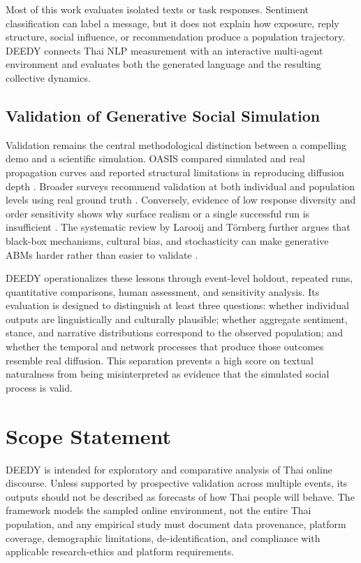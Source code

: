\documentclass[10pt,twocolumn]{article}
\begin{document}
Most of this work evaluates isolated texts or task responses. Sentiment
classification can label a message, but it does not explain how exposure,
reply structure, social influence, or recommendation produce a population
trajectory. DEEDY connects Thai NLP measurement with an interactive
multi-agent environment and evaluates both the generated language and the
resulting collective dynamics.

\subsection{Validation of Generative Social Simulation}

Validation remains the central methodological distinction between a compelling
demo and a scientific simulation. OASIS compared simulated and real
propagation curves and reported structural limitations in reproducing
diffusion depth \citep{yang2024oasis}. Broader surveys recommend validation at
both individual and population levels using real ground truth
\citep{gao2024survey}. Conversely, evidence of low response diversity and
order sensitivity shows why surface realism or a single successful run is
insufficient \citep{park2024diversity}. The systematic review by Larooij and
T\"ornberg further argues that black-box mechanisms, cultural bias, and
stochasticity can make generative ABMs harder rather than easier to validate
\citep{larooij2026validation}.

DEEDY operationalizes these lessons through event-level holdout, repeated
runs, quantitative comparisons, human assessment, and sensitivity analysis.
Its evaluation is designed to distinguish at least three questions: whether
individual outputs are linguistically and culturally plausible; whether
aggregate sentiment, stance, and narrative distributions correspond to the
observed population; and whether the temporal and network processes that
produce those outcomes resemble real diffusion. This separation prevents a
high score on textual naturalness from being misinterpreted as evidence that
the simulated social process is valid.

\section{Scope Statement}
\label{sec:scope}

DEEDY is intended for exploratory and comparative analysis of Thai online
discourse. Unless supported by prospective validation across multiple events,
its outputs should not be described as forecasts of how Thai people will
behave. The framework models the sampled online environment, not the entire
Thai population, and any empirical study must document data provenance,
platform coverage, demographic limitations, de-identification, and compliance
with applicable research-ethics and platform requirements.



\end{document}
